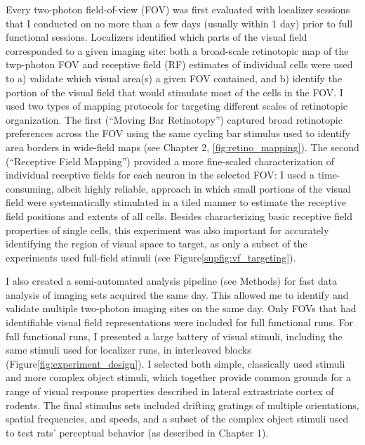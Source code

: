 Every two-photon field-of-view (FOV) was first evaluated with localizer sessions that I conducted on no more than a few days (usually within 1 day) prior to full functional sessions. Localizers identified which parts of the visual field corresponded to a given imaging site: both a broad-scale retinotopic map of the twp-photon FOV and receptive field (RF) estimates of individual cells were used to a) validate which visual area(s) a given FOV contained, and b) identify the portion of the visual field that would stimulate most of the cells in the FOV. I used two types of mapping protocols for targeting different scales of retinotopic organization. The first (``Moving Bar Retinotopy'') captured broad retinotopic preferences across the FOV using the same cycling bar stimulus used to identify area borders in wide-field maps (see Chapter 2, \ref{fig:retino_mapping}). The second (``Receptive Field Mapping'') provided a more fine-scaled characterization of individual receptive fields for each neuron in the selected FOV:  I used a time-consuming, albeit highly reliable, approach in which small portions of the visual field were systematically stimulated in a tiled manner to estimate the receptive field positions and extents of all cells. Besides characterizing basic receptive field properties of single cells, this experiment was also important for accurately identifying the region of visual space to target, as only a subset of the experiments used full-field stimuli (see Figure\ref{supfig:vf_targeting}).

I also created a semi-automated analysis pipeline (see Methods) for fast data analysis of imaging sets acquired the same day. This allowed me to identify and validate multiple two-photon imaging sites on the same day. Only FOVs that had identifiable visual field representations were included for full functional runs. For full functional runs, I presented a large battery of visual stimuli, including the same stimuli used for localizer runs, in interleaved blocks (Figure\ref{fig:experiment_design}). I selected both simple, classically used stimuli and more complex object stimuli, which together provide common grounds for a range of visual response properties described in lateral extrastriate cortex of rodents. The final stimulus sets included drifting gratings of multiple orientations, spatial frequencies, and speeds, and a subset of the complex object stimuli used to test rats' perceptual behavior (as described in Chapter 1).


